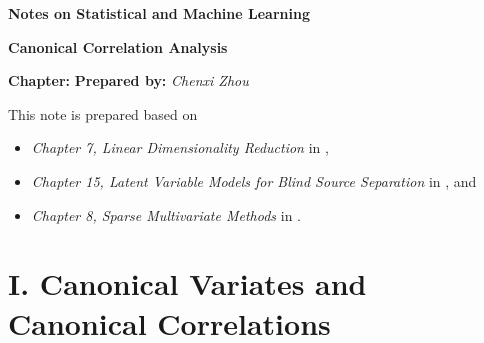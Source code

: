 \documentclass[12pt]{article}
\newcommand{\titlebox}[4]{
\begin{tcolorbox}[colback = blue!5!white!95, colframe = blue!70!black
]
  \noindent \textbf{ #1 } \hfill \textit{#2} 
  \begin{center}
  	 \LARGE{\textbf{#3}}
  \end{center}
\textbf{Chapter:} \textit{\text{#4}} \hfill \textbf{Prepared by:} \textit{Chenxi Zhou}
\end{tcolorbox}
}
\begin{document}
\thispagestyle{plain}
\titlebox{Notes on Statistical and Machine Learning}{}{Canonical Correlation Analysis}{24}

\vspace{10pt} 

This note is prepared based on 
\begin{itemize}
	\item \textit{Chapter 7, Linear Dimensionality Reduction} in \textcite{Izenman2009-jk}, 
	\item \textit{Chapter 15, Latent Variable Models for Blind Source Separation} in \textcite{Izenman2009-jk}, and 
	\item \textit{Chapter 8, Sparse Multivariate Methods} in \textcite{Hastie2015-rm}. 
\end{itemize}


\section*{I. Canonical Variates and Canonical Correlations}
\end{document}
